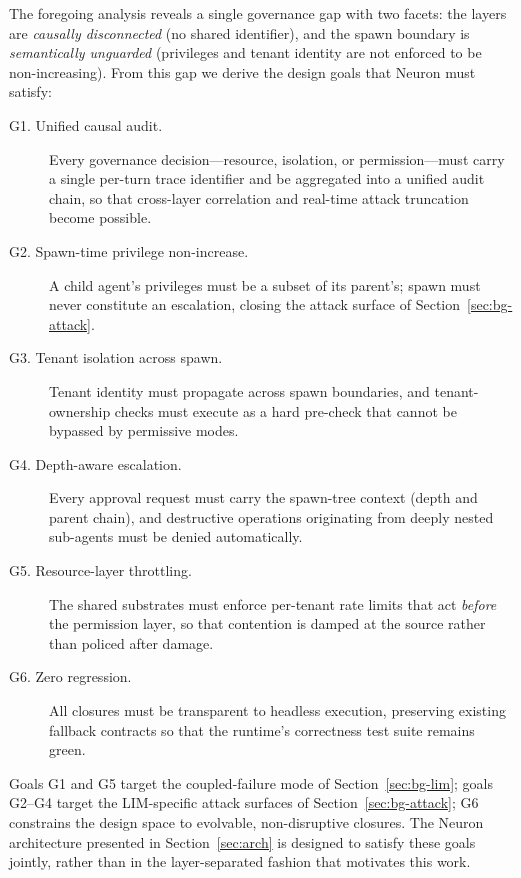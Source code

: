 The foregoing analysis reveals a single governance gap with two facets: the
layers are \emph{causally disconnected} (no shared identifier), and the spawn
boundary is \emph{semantically unguarded} (privileges and tenant identity are
not enforced to be non-increasing). From this gap we derive the design goals
that Neuron must satisfy:

\begin{description}
    \item[G1. Unified causal audit.] Every governance decision---resource,
    isolation, or permission---must carry a single per-turn trace identifier
    and be aggregated into a unified audit chain, so that cross-layer
    correlation and real-time attack truncation become possible.

    \item[G2. Spawn-time privilege non-increase.] A child agent's privileges
    must be a subset of its parent's; spawn must never constitute an
    escalation, closing the attack surface of Section~\ref{sec:bg-attack}.

    \item[G3. Tenant isolation across spawn.] Tenant identity must propagate
    across spawn boundaries, and tenant-ownership checks must execute as a
    hard pre-check that cannot be bypassed by permissive modes.

    \item[G4. Depth-aware escalation.] Every approval request must carry the
    spawn-tree context (depth and parent chain), and destructive operations
    originating from deeply nested sub-agents must be denied automatically.

    \item[G5. Resource-layer throttling.] The shared substrates must enforce
    per-tenant rate limits that act \emph{before} the permission layer, so
    that contention is damped at the source rather than policed after damage.

    \item[G6. Zero regression.] All closures must be transparent to headless
    execution, preserving existing fallback contracts so that the runtime's
    correctness test suite remains green.
\end{description}

Goals G1 and G5 target the coupled-failure mode of Section~\ref{sec:bg-lim}; goals
G2--G4 target the LIM-specific attack surfaces of Section~\ref{sec:bg-attack}; G6
constrains the design space to evolvable, non-disruptive closures. The Neuron
architecture presented in Section~\ref{sec:arch} is designed to satisfy these
goals jointly, rather than in the layer-separated fashion that motivates this
work.
